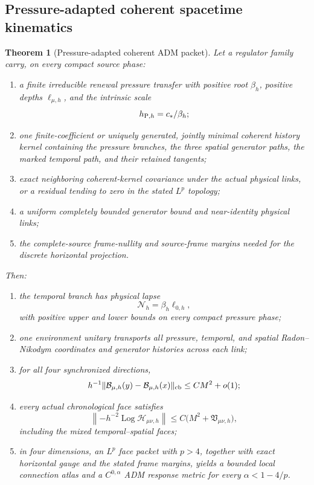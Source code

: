 \documentclass[11pt]{article}
\newtheorem{theorem}{Theorem}[section]
\theoremstyle{definition}
\theoremstyle{remark}
\begin{document}
\subsection{Pressure-adapted coherent spacetime kinematics}

\begin{theorem}[Pressure-adapted coherent ADM packet]
\label{thm:master-coherent-ADM-v036}
Let a regulator family carry, on every compact source phase:
\begin{enumerate}[label=\textup{(P\arabic*)},leftmargin=3em]
\item a finite irreducible renewal pressure transfer with positive root
      \(\beta_h\), positive depths \(\ell_{\mu,h}\), and the intrinsic scale
      \[
        h_{{\rm P},h}=c_*/\beta_h;
      \]
\item one finite-coefficient or uniquely generated, jointly minimal coherent
      history kernel containing the pressure branches, the three spatial
      generator paths, the marked temporal path, and their retained tangents;
\item exact neighboring coherent-kernel covariance under the actual physical
      links, or a residual tending to zero in the stated \(L^p\) topology;
\item a uniform completely bounded generator bound and near-identity physical
      links;
\item the complete-source frame-nullity and source-frame margins needed for
      the discrete horizontal projection.
\end{enumerate}
Then:
\begin{enumerate}[label=\textup{(\roman*)},leftmargin=2.8em]
\item the temporal branch has physical lapse
      \[
        \boxed{\mathcal N_h=\beta_h\ell_{0,h}},
      \]
      with positive upper and lower bounds on every compact pressure phase;
\item one environment unitary transports all pressure, temporal, and spatial
      Radon--Nikodym coordinates and generator histories across each link;
\item for all four synchronized directions,
      \[
        h^{-1}\|\mathcal B_{\mu,h}(y)-\mathcal B_{\mu,h}(x)\|_{\rm cb}
        \le C M^2+o(1);
      \]
\item every actual chronological face satisfies
      \[
        \left\|-h^{-2}\operatorname{Log}\mathscr H_{\mu\nu,h}\right\|
        \le C\bigl(M^2+\mathfrak V_{\mu\nu,h}\bigr),
      \]
      including the mixed temporal--spatial faces;
\item in four dimensions, an \(L^p\) face packet with \(p>4\), together with
      exact horizontal gauge and the stated frame margins, yields a bounded
      local connection atlas and a \(C^{0,\alpha}\) ADM response metric for
      every \(\alpha<1-4/p\).
\end{enumerate}
\end{theorem}
\end{document}
